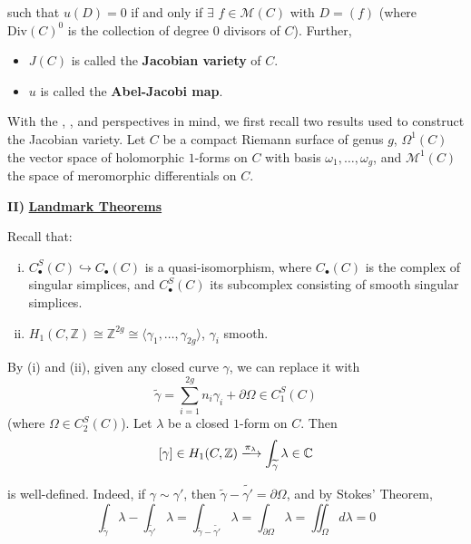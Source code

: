 \documentclass[11pt,a4paper]{article}
\begin{document}
such that $u(D) = 0$ if and only if $\exists$ $f\in \mathcal{M}(C)$ with $D = (f)$ (where $\text{Div}(C)^0$ is the collection of degree $0$ divisors of $C$). Further,
\begin{itemize}
    \item $J(C)$ is called the \textbf{Jacobian variety} of $C$.
    \item $u$ is called the \textbf{Abel-Jacobi map}.
\end{itemize}

With the , , and  perspectives in mind, we first recall two results used to construct the Jacobian variety. Let $C$ be a compact Riemann surface of genus $g$, $\Omega^1(C)$ the vector space of holomorphic $1$-forms on $C$ with basis $\omega_1, \ldots, \omega_g$, and $\mathcal{M}^1(C)$ the space of meromorphic differentials on $C$.

\textbf{II)} \underline{\textbf{Landmark Theorems}}

Recall that:

\begin{enumerate}[(i)]
    \item $C_{\bullet}^S(C) \hookrightarrow C_{\bullet}(C)$ is a quasi-isomorphism, where $C_{\bullet}(C)$ is the complex of singular simplices, and $C_{\bullet}^S(C)$ its subcomplex consisting of smooth singular simplices.
    \item $H_1(C, \mathbb{Z}) \cong \mathbb{Z}^{2g} \cong \langle \gamma_1, \ldots, \gamma_{2g}\rangle$, $\gamma_i$ smooth.
\end{enumerate}

By (i) and (ii), given any closed curve $\gamma$, we can replace it with $$\widetilde{\gamma} = \sum_{i=1}^{2g}{n_i\gamma_i} + \partial \Omega \in C^S_1(C)$$ (where $\Omega \in C^S_2(C)$). Let $\lambda$ be a closed $1$-form on $C$. Then
$$[\gamma] \in H_1(C, \mathbb{Z}) \xlongrightarrow{\pi_{\lambda}} \int_{\widetilde{\gamma}} \lambda \in \mathbb{C}$$

is well-defined. Indeed, if $\gamma\sim\gamma'$, then $\widetilde{\gamma} - \widetilde{\gamma'} = \partial \Omega$, and by Stokes' Theorem,
$$\int_{\widetilde{\gamma}}\lambda - \int_{\widetilde{\gamma'}}\lambda = \int_{\widetilde{\gamma} - \widetilde{\gamma'}}\lambda = \int_{\partial \Omega}\lambda = \iint_{\Omega}d\lambda = 0$$
\end{document}
